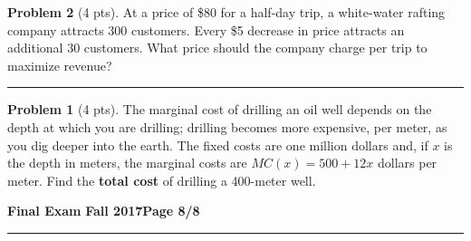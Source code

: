 \documentclass[12pt]{article}
\theoremstyle{definition}
\newtheorem{problem}{Problem}
\begin{document}
\begin{problem}[4 pts]
At a price of \$80 for a half-day trip, a white-water rafting company attracts 300 customers.  Every \$5 decrease in price attracts an additional 30 customers.  What price should the company charge per trip to maximize revenue?
\vspace{7cm}
\hrule

\begin{problem}[4 pts]
The marginal cost of drilling an oil well depends on the depth at which you are drilling; drilling becomes more expensive, per meter, as you dig deeper into the earth.  The fixed costs are one million dollars and, if $x$ is the depth in meters, the marginal costs are $MC(x) = 500 + 12x$ dollars per meter.  Find the \textbf{total cost} of drilling a 400-meter well.
\end{problem}

\end{problem}

\newpage

\hfill{\large\bf Final Exam}\hfill{\large\bf
  Fall 2017}\hfill{\large\bf Page 8/8}\hrule
\end{document}
